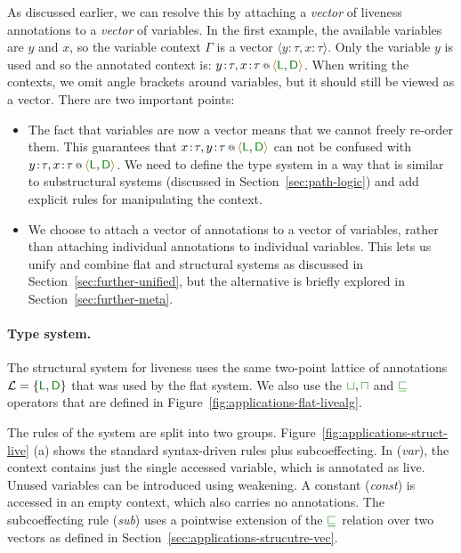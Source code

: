 As discussed earlier, we can resolve this by attaching a \emph{vector} of liveness annotations to
a \emph{vector} of variables. In the first example, the available variables are $y$ and $x$, so
the variable context $\Gamma$ is a vector $\langle y\!:\!\tau, x\!:\!\tau \rangle$. Only the variable $y$
is used and so the annotated context is: $\coctx{y\!:\!\tau, x\!:\!\tau}{ \alift{\cclrd{\cclrd{\ident{L}}}, \cclrd{\cclrd{\ident{D}}}} }$.
When writing the contexts, we omit angle brackets around variables, but it should still be viewed
as a vector. There are two important points:

\begin{itemize}
\item The fact that variables are now a vector means that we cannot freely re-order them. This
  guarantees that $\coctx{x\!:\!\tau, y\!:\!\tau}{\alift{\cclrd{\cclrd{\ident{L}}}, \cclrd{\cclrd{\ident{D}}}}}$
  can not be confused with $\coctx{y\!:\!\tau, x\!:\!\tau}{\alift{\cclrd{\cclrd{\ident{L}}}, \cclrd{\cclrd{\ident{D}}}}}$.
  We need to define the type system in a way that is similar to substructural systems
  (discussed in Section~\ref{sec:path-logic}) and add explicit rules for manipulating
  the context.

\item We choose to attach a vector of annotations to a vector of variables, rather than attaching
  individual annotations to individual variables. This lets us unify and combine flat and
  structural systems as discussed in Section~\ref{sec:further-unified}, but the alternative is briefly
  explored in Section~\ref{sec:further-meta}.
\end{itemize}

\paragraph{Type system.}
The structural system for liveness uses the same two-point lattice of annotations
$\mathcal{L}=\{ \cclrd{\cclrd{\ident{L}}}, \cclrd{\cclrd{\ident{D}}} \}$ that was used by the flat system. We also use the
$\cclrd{\sqcup}, \cclrd{\sqcap}$ and $\cclrd{\sqsubseteq}$ operators that are defined in Figure~\ref{fig:applications-flat-livealg}.

The rules of the system are split into two groups. Figure~\ref{fig:applications-struct-live} (a) shows
the standard syntax-driven rules plus subcoeffecting. In (\emph{var}), the context contains just the
single accessed variable, which is annotated as live. Unused variables can be introduced using weakening.
A constant (\emph{const}) is accessed in an empty context, which also carries no annotations. The
subcoeffecting rule (\emph{sub}) uses a pointwise extension of the $\cclrd{\sqsubseteq}$ relation over two
vectors as defined in Section~\ref{sec:applications-strucutre-vec}.

